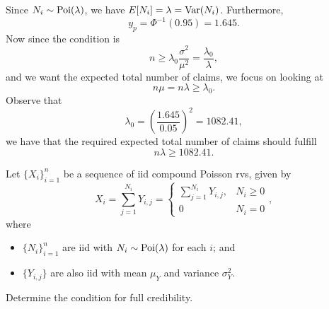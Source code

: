 \documentclass[notoc,notitlepage]{tufte-book}
\begin{document}
\begin{solution}
  Since $N_i \sim \operatorname{Poi}(\lambda)$, we have $E[N_i] = \lambda = \operatorname{Var}(N_i)$.
  Furthermore,
  \begin{equation*}
    y_p = \Phi^{-1} \left( 0.95 \right) = 1.645.
  \end{equation*}
  Now since the condition is
  \begin{equation*}
    n \geq \lambda_0 \frac{\sigma^2}{\mu^2} = \frac{\lambda_0}{\lambda},
  \end{equation*}
  and we want the expected total number of claims, we focus on looking at
  \begin{equation*}
    n \mu = n \lambda \geq \lambda_0.
  \end{equation*}
  Observe that
  \begin{equation*}
    \lambda_0 = \left( \frac{1.645}{0.05} \right)^2 = 1082.41,
  \end{equation*}
  we have that the required expected total number of claims should fulfill
  \begin{equation*}
    n\lambda \geq 1082.41.
  \end{equation*}
\end{solution}

\begin{eg}\label{eg:compound_poisson_for_full_credibility}
  Let $\{ X_i \}_{i=1}^n$ be a sequence of iid compound Poisson rvs, given by
  \begin{equation*}
    X_i = \sum_{j=1}^{N_i} Y_{i, j} = \begin{cases}
      \sum_{j=1}^{N_i} Y_{i, j}, & N_i \geq 0 \\
      0                          & N_i = 0
    \end{cases},
  \end{equation*}
  where
  \begin{itemize}
    \item $\{ N_i \}_{i=1}^{n}$ are iid with $N_i \sim \operatorname{Poi}(\lambda)$ for each
      $i$; and
    \item $\{ Y_{i, j} \}$ are also iid with mean $\mu_Y$ and variance
      $\sigma^2_Y$.
  \end{itemize}
  Determine the condition for full credibility.
\end{eg}
\end{document}
